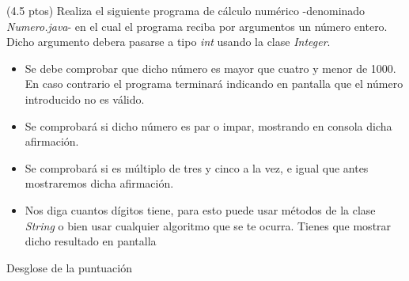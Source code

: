 \documentclass[addpoints,12pt]{exam}
\begin{document}
\begin{questions}
\question(4.5 ptos) Realiza el siguiente programa de cálculo numérico -denominado \emph{Numero.java}- en el cual el programa reciba por argumentos un número entero. Dicho argumento debera pasarse a tipo \textit{int} usando la clase \textit{Integer}.
\begin{itemize}
\item Se debe comprobar que dicho número es mayor que cuatro y menor de 1000. En caso contrario el programa terminará indicando en pantalla que el número introducido no es válido.
\item Se comprobará si dicho número es par o impar, mostrando en consola dicha afirmación.
\item Se comprobará si es múltiplo de tres y cinco a la vez, e igual que antes mostraremos dicha afirmación.
\item Nos diga cuantos dígitos tiene, para esto puede usar métodos de la clase \emph{String} o bien usar cualquier algoritmo que se te ocurra. Tienes que mostrar dicho resultado en pantalla
\end{itemize}
Desglose de la puntuación
\end{questions}
\end{document}
